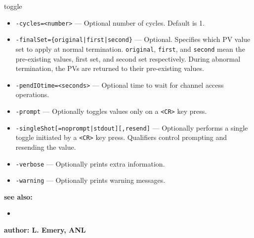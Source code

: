 \begin{sddsprog}{toggle}
\begin{itemize}
        \item {\tt -cycles=<number>} --- Optional number of cycles. Default is 1.
        \item {\tt -finalSet=\{original|first|second\}} --- Optional. Specifies which PV value set to apply at normal termination.
                 \verb+original+, \verb+first+, and \verb+second+ mean the pre-existing values, first set, and second set respectively.
                 During abnormal termination, the PVs are returned to their pre-existing values.
        \item {\tt -pendIOtime=<seconds>} --- Optional time to wait for channel access operations.
        \item {\tt -prompt} --- Optionally toggles values only on a \verb+<CR>+ key press.
        \item {\tt -singleShot[=noprompt|stdout][,resend]} --- Optionally performs a single toggle initiated by a \verb+<CR>+ key press. Qualifiers control prompting and resending the value.
        \item {\tt -verbose} --- Optionally prints extra information.
        \item {\tt -warning} --- Optionally prints warning messages.
    \end{itemize}

\item {\bf see also:}
    \begin{itemize}
%
%
    \item {}
    \end{itemize}
%
%
\item {\bf author: L. Emery, ANL} 
\end{sddsprog}
